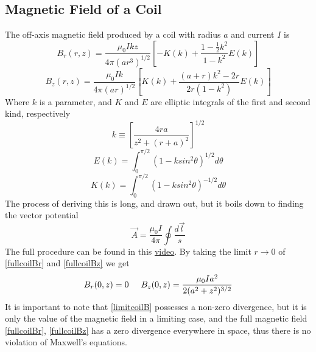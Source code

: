 \documentclass[12pt]{article}
\begin{document}
\subsection{Magnetic Field of a Coil}
The off-axis magnetic field produced by a coil with radius $a$ and current $I$ is
\begin{equation}\label{fullcoilBr}
B_r(r,z)=\frac{\mu_0Ikz}{4\pi(ar^3)^{1/2}}\left[-K(k)+\frac{1-\frac{1}{2}k^2}{1-k^2}E(k)\right]
\end{equation}
\begin{equation}\label{fullcoilBz}
B_z(r,z)=\frac{\mu_0Ik}{4\pi(ar)^{1/2}}\left[K(k)+\frac{(a+r)k^2-2r}{2r(1-k^2)}E(k)\right]
\end{equation}
Where $k$ is a parameter, and $K$ and $E$ are elliptic integrals of the first and second kind, respectively \cite{Stacey}
\begin{equation}\label{k}
k\equiv\left[\frac{4ra}{z^2+(r+a)^2}\right]^{1/2}
\end{equation}
\begin{equation}\label{ellipE}
E(k)=\int^{\pi/2}_0(1-ksin^2\theta)^{1/2}d\theta
\end{equation}
\begin{equation}\label{ellipK}
K(k)=\int^{\pi/2}_0(1-ksin^2\theta)^{-1/2}d\theta
\end{equation}
The process of deriving this is long, and drawn out, but it boils down to finding the vector potential
$$\vec{A}=\frac{\mu_0I}{4\pi}\oint\frac{d\vec{l}}{s}$$
The full procedure can be found in this \href{https://www.grant-trebbin.com/2012/04/off-axis-magnetic-field-of-circular.html}{video}. By taking the limit $r\rightarrow 0$ of \eqref{fullcoilBr} and \eqref{fullcoilBz} we get 
\begin{equation}\label{limitcoilB}
B_r(0,z)=0 \hspace{5mm} B_z(0,z)=\frac{\mu_0Ia^2}{2(a^2+z^2)^{3/2}}
\end{equation}
It is important to note that \eqref{limitcoilB} possesses a non-zero divergence, but it is only the value of the magnetic field in a limiting case, and the full magnetic field \eqref{fullcoilBr}, \eqref{fullcoilBz} has a zero divergence everywhere in space, thus there is no violation of Maxwell's equations.
\end{document}
